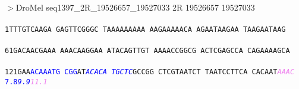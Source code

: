 \documentclass[11pt,twoside,reqno,a4paper]{article}
\begin{document}
\\
$>$DroMel	seq1397\_2R\_19526657\_19527033	2R	19526657	19527033 \\
 \\
\texttt{1\hspace*{3\charwidth}TTTGTCAAGA	GAGTTCGGGC	TAAAAAAAAA	AAGAAAAACA	AGAATAAGAA	TAAGAATAAG	\\
\hspace*{4\charwidth}\hspace*{1\charwidth}\hspace*{1\charwidth}\hspace*{1\charwidth}\hspace*{1\charwidth}\hspace*{1\charwidth}\hspace*{1\charwidth}\\
61\hspace*{2\charwidth}GACAACGAAA	AAACAAGGAA	ATACAGTTGT	AAAACCGGCG	ACTCGAGCCA	CAGAAAAGCA	\\
\hspace*{4\charwidth}\hspace*{1\charwidth}\hspace*{1\charwidth}\hspace*{1\charwidth}\hspace*{1\charwidth}\hspace*{1\charwidth}\hspace*{1\charwidth}\\
121\hspace*{1\charwidth}GAA\textcolor{blue}{A}\textcolor{blue}{C}\textcolor{blue}{A}\textcolor{blue}{A}\textcolor{blue}{A}\textcolor{blue}{T}\textcolor{blue}{G}	\textcolor{blue}{C}\textcolor{blue}{G}\textcolor{blue}{G}AT\textit{\textcolor{blue}{A}}\textit{\textcolor{blue}{C}}\textit{\textcolor{blue}{A}}\textit{\textcolor{blue}{C}}\textit{\textcolor{blue}{A}}	\textit{\textcolor{blue}{T}}\textit{\textcolor{blue}{G}}\textit{\textcolor{blue}{C}}\textit{\textcolor{blue}{T}}\textit{\textcolor{blue}{C}}GCCGG	CTCGTAATCT	TAATCCTTCA	CACAAT\textit{\textcolor{violet}{A}}\textit{\textcolor{violet}{A}}\textit{\textcolor{violet}{A}}\textit{\textcolor{violet}{C}}	\\
\hspace*{4\charwidth}\hspace*{3\charwidth}\textcolor{blue}{7.8}\hspace*{1\charwidth}\hspace*{9\charwidth}\textit{\textcolor{blue}{9.9}}\hspace*{1\charwidth}\hspace*{1\charwidth}\hspace*{1\charwidth}\hspace*{1\charwidth}\hspace*{38\charwidth}\textit{\textcolor{violet}{11.1}}\hspace*{1\charwidth}\\
}
\end{document}

